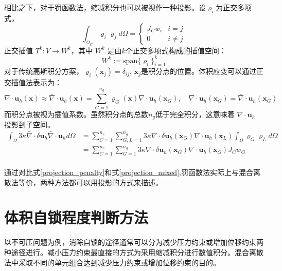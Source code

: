 相比之下，对于罚函数法，缩减积分也可以被视作一种投影。设$\varrho_i$为正交多项式，
\begin{equation}
    \int_{\Omega_C} \varrho_i \varrho_j d\Omega = 
    \begin{cases}
        J_C w_i  & i = j \\
        0 & i \ne j
    \end{cases}
\end{equation}
正交插值 $T^{k}: V \rightarrow W^{k}$，其中 $W^{k}$ 是由$k$个正交多项式构成的插值空间：
\begin{equation}
    W^{k}:= \mathrm{span}\{\varrho_i \}_{i=1}^{k}
\end{equation}
对于传统高斯积分方案，$\varrho_i(\boldsymbol x_j) = \delta_{ij}$, $\boldsymbol x_j$是积分点的位置。体积应变可以通过正交插值法表示为：
\begin{equation}
    \nabla \cdot \boldsymbol u_h(\boldsymbol x) \approx \bar \nabla \cdot \boldsymbol u_h(\boldsymbol x) = \sum_{G=1}^{n_g} \varrho_G(\boldsymbol x) \nabla \cdot \boldsymbol u_h(\boldsymbol x_G), \quad \nabla \cdot \boldsymbol u_h(\boldsymbol x_G) = \bar \nabla \cdot \boldsymbol u_h(\boldsymbol x_G)
\end{equation}
而积分点被视为插值系数。虽然积分点的总数$n_g$低于完全积分，这意味着 $\nabla \cdot \boldsymbol u_h$ 投影到子空间。
\begin{equation}\label{projection_penalty}
    \begin{split}
        \int_\Omega 3\kappa \bar \nabla \cdot \delta \boldsymbol u_h \bar \nabla \cdot \boldsymbol u_h d\Omega
        &= \sum_{C=1}^{n_e} \sum_{G,L=1}^{n_g} 3\kappa \nabla \cdot \delta \boldsymbol u_h(\boldsymbol x_G) \nabla \cdot \boldsymbol u_h(\boldsymbol x_L) \int_\Omega \varrho_G \varrho_L d\Omega  \\
        &= \sum_{C=1}^{n_e} \sum_{G=1}^{n_g} 3\kappa \nabla \cdot \delta \boldsymbol u_h(\boldsymbol x_G) \nabla \cdot \boldsymbol u_h(\boldsymbol x_G) J_C w_G \\
    \end{split}
\end{equation}

通过对比式\eqref{projection_penalty}和式\eqref{projection_mixed},罚函数法实际上与混合离散法等价，两种方法都可以用投影的方式来描述。

\section{体积自锁程度判断方法}
以不可压问题为例，消除自锁的途径通常可以分为减少压力约束或增加位移约束两种途径进行。减小压力约束最直接的方式为采用缩减积分进行数值积分。混合离散法中采取不同的单元组合达到减少压力约束或增加位移约束的目的。
